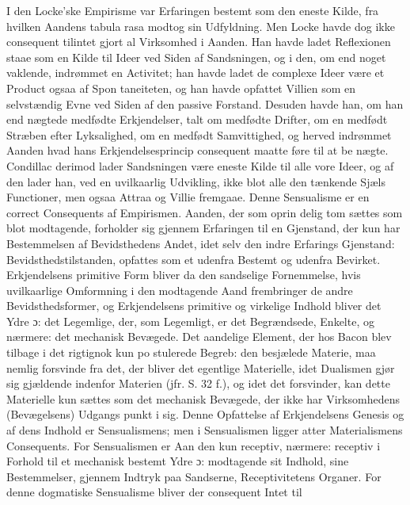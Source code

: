 \documentclass[12pt,a4paper]{book}
\begin{document}
I den Locke'ske Empirisme var Erfaringen bestemt som
den eneste Kilde, fra hvilken Aandens tabula rasa modtog sin
Udfyldning. Men Locke havde dog ikke consequent tilintet\-%
gjort al Virksomhed i Aanden. Han havde ladet Reflexionen
staae som en Kilde til Ideer ved Siden af Sandsningen, og i
den, om end noget vaklende, indrømmet en Activitet; han
havde ladet de complexe Ideer være et Product ogsaa af Spon\-%
taneiteten, og han havde opfattet Villien som en selvstændig
Evne ved Siden af den passive Forstand. Desuden havde han,
om han end nægtede medfødte Erkjendelser, talt om medfødte
Drifter, om en medfødt Stræben efter Lyksalighed, om en
medfødt Samvittighed, og herved indrømmet Aanden hvad
hans Erkjendelsesprincip consequent maatte føre til at be\-%
nægte. Condillac derimod lader Sandsningen være eneste Kilde
til alle vore Ideer, og af den lader han, ved en uvilkaarlig
Udvikling, ikke blot alle den tænkende Sjæls Functioner, men
ogsaa Attraa og Villie fremgaae. Denne Sensualisme er en
correct Consequents af Empirismen. Aanden, der som oprin\-%
delig tom sættes som blot modtagende, forholder sig gjennem
Erfaringen til en Gjenstand, der kun har Bestemmelsen af
Bevidsthedens Andet, idet selv den indre Erfarings Gjenstand:
Bevidsthedstilstanden, opfattes som et udenfra Bestemt og
udenfra Bevirket. Erkjendelsens primitive Form bliver da den
sandselige Fornemmelse, hvis uvilkaarlige Omformning i den
modtagende Aand frembringer de andre Bevidsthedsformer, og
Erkjendelsens primitive og virkelige Indhold bliver det Ydre
ɔ: det Legemlige, der, som Legemligt, er det Begrændsede,
Enkelte, og nærmere: det mechanisk Bevægede. Det aandelige
Element, der hos Bacon blev tilbage i det rigtignok kun po\-%
stulerede Begreb: den besjælede Materie, maa nemlig forsvinde
fra det, der bliver det egentlige Materielle, idet Dualismen
gjør sig gjældende indenfor Materien (jfr. S. 32 f.), og idet det
forsvinder, kan dette Materielle kun sættes som det mechanisk
Bevægede, der ikke har Virksomhedens (Bevægelsens) Udgangs\-%
punkt i sig. Denne Opfattelse af Erkjendelsens Genesis og af
dens Indhold er Sensualismens; men i Sensualismen ligger
atter Materialismens Consequents. For Sensualismen er Aan\-%
den kun receptiv, nærmere: receptiv i Forhold til et mechanisk
bestemt Ydre ɔ: modtagende sit Indhold, sine Bestemmelser,
gjennem Indtryk paa Sandserne, Receptivitetens Organer. For
denne dogmatiske Sensualisme bliver der consequent Intet til\-%
\end{document}
